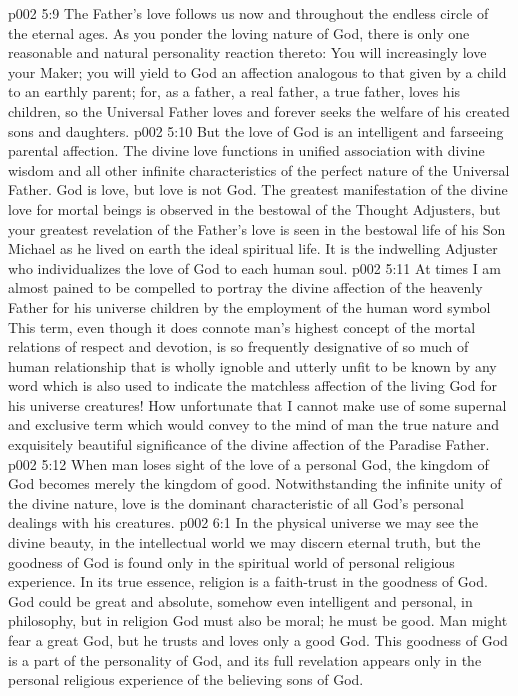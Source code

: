 \vs p002 5:9 The Father’s love follows us now and throughout the endless circle of the eternal ages. As you ponder the loving nature of God, there is only one reasonable and natural personality reaction thereto: You will increasingly love your Maker; you will yield to God an affection analogous to that given by a child to an earthly parent; for, as a father, a real father, a true father, loves his children, so the Universal Father loves and forever seeks the welfare of his created sons and daughters.
\vs p002 5:10 But the love of God is an intelligent and farseeing parental affection. The divine love functions in unified association with divine wisdom and all other infinite characteristics of the perfect nature of the Universal Father. God is love, but love is not God. The greatest manifestation of the divine love for mortal beings is observed in the bestowal of the Thought Adjusters, but your greatest revelation of the Father’s love is seen in the bestowal life of his Son Michael as he lived on earth the ideal spiritual life. It is the indwelling Adjuster who individualizes the love of God to each human soul.
\vs p002 5:11 \pc At times I am almost pained to be compelled to portray the divine affection of the heavenly Father for his universe children by the employment of the human word symbol  This term, even though it does connote man’s highest concept of the mortal relations of respect and devotion, is so frequently designative of so much of human relationship that is wholly ignoble and utterly unfit to be known by any word which is also used to indicate the matchless affection of the living God for his universe creatures! How unfortunate that I cannot make use of some supernal and exclusive term which would convey to the mind of man the true nature and exquisitely beautiful significance of the divine affection of the Paradise Father.
\vs p002 5:12 \pc When man loses sight of the love of a personal God, the kingdom of God becomes merely the kingdom of good. Notwithstanding the infinite unity of the divine nature, love is the dominant characteristic of all God’s personal dealings with his creatures.
\vs p002 6:1 In the physical universe we may see the divine beauty, in the intellectual world we may discern eternal truth, but the goodness of God is found only in the spiritual world of personal religious experience. In its true essence, religion is a faith\hyp{}trust in the goodness of God. God could be great and absolute, somehow even intelligent and personal, in philosophy, but in religion God must also be moral; he must be good. Man might fear a great God, but he trusts and loves only a good God. This goodness of God is a part of the personality of God, and its full revelation appears only in the personal religious experience of the believing sons of God.
